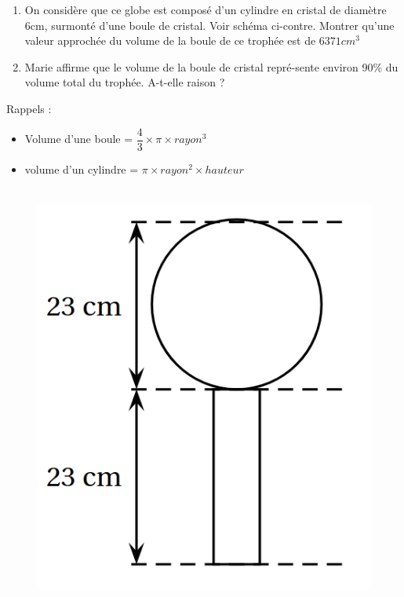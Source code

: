 \documentclass[11pt]{article}
\begin{document}
\begin{multicols}{2}

  \begin{enumerate}
  \item On considère que ce globe est composé d’un cylindre en cristal de diamètre 6cm, surmonté d’une boule de cristal. Voir schéma ci-contre. Montrer qu’une valeur approchée du volume de la boule de ce trophée est de $6 371 cm^3$
  \item Marie affirme que le volume de la boule de cristal repré-sente environ 90\% du volume total du trophée. A-t-elle raison ?
  \end{enumerate}

  Rappels : 

  \begin{itemize}
  \item Volume d’une boule = $\dfrac{4}{3} \times \pi \times rayon^3$
  \item volume d’un cylindre = $\pi \times rayon^2 \times hauteur$
  \end{itemize}

  \begin{figure}[H]
        \centering
        \includegraphics[width=0.8\linewidth]{3x3-volumes-1/sources/globe.png}
  \end{figure}
\end{multicols}

\newpage
\end{document}
